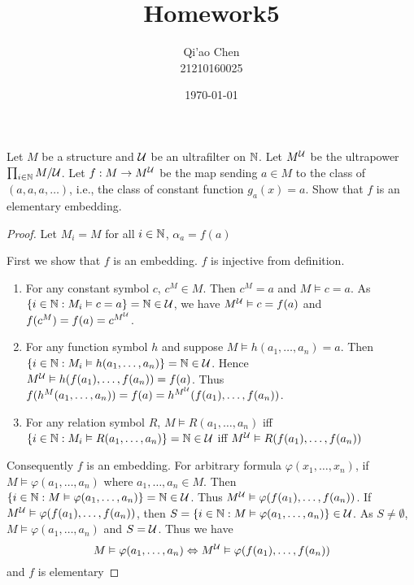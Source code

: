 \documentclass[11pt]{article}
\author{Qi'ao Chen\\21210160025}
\date{\today}
\title{Homework5}
\begin{document}
\maketitle
\begin{exercise}
Let \(M\) be a structure and \(\mathcal{U}\) be an ultrafilter on \(\mathbb{N}\). Let \(M^{\mathcal{U}}\) be the
ultrapower \(\prod_{i\in\mathbb{N}}M/\mathcal{U}\). Let \(f:M\to M^{\mathcal{U}}\) be the map sending \(a\in M\) to the class
of \((a,a,a,\dots)\), i.e., the class of constant function \(g_a(x)=a\). Show that \(f\) is an elementary
embedding.
\end{exercise}

\begin{proof}
Let \(M_i=M\) for all \(i\in\mathbb{N}\), \(\alpha_a=f(a)\)


First we show that \(f\) is an embedding. \(f\) is injective from definition.

\begin{enumerate}
\item For any constant symbol \(c\), \(c^M\in M\). Then \(c^M=a\) and \(M\vDash c=a\). As \(\{i\in\mathbb{N}:M_i\vDash c=a\}=\mathbb{N}\in\mathcal{U}\),
we have \(M^{\mathcal{U}}\vDash c=f(a)\) and \(f(c^M)=f(a)=c^{M^{\mathcal{U}}}\).
\item For any function symbol \(h\) and suppose \(M\vDash h(a_1,\dots,a_n)=a\).
Then \(\{i\in\mathbb{N}:M_i\vDash h(a_1,\dots,a_n)\}=\mathbb{N}\in\mathcal{U}\). Hence \(M^{\mathcal{U}}\vDash h(f(a_1),\dots,f(a_n))=f(a)\). Thus
\(f(h^M(a_1,\dots,a_n))=f(a)=h^{M^{\mathcal{U}}}(f(a_1),\dots,f(a_n))\).
\item For any relation symbol \(R\), \(M\vDash R(a_1,\dots,a_n)\) iff \(\{i\in\mathbb{N}:M_i\vDash R(a_1,\dots,a_n)\}=\mathbb{N}\in\mathcal{U}\)
iff \(M^{\mathcal{U}}\vDash R(f(a_1),\dots,f(a_n))\)
\end{enumerate}


Consequently \(f\) is an embedding. For arbitrary formula \(\varphi(x_1,\dots,x_n)\), if \(M\vDash\varphi(a_1,\dots,a_n)\) where \(a_1,\dots,a_n\in M\).
Then \(\{i\in\mathbb{N}:M\vDash\varphi(a_1,\dots,a_n)\}=\mathbb{N}\in\mathcal{U}\). Thus \(M^{\mathcal{U}}\vDash\varphi(f(a_1),\dots,f(a_n))\). If \(M^{\mathcal{U}}\vDash\varphi(f(a_1),\dots,f(a_n))\),
then \(S=\{i\in\mathbb{N}:M\vDash\varphi(a_1,\dots,a_n)\}\in\mathcal{U}\). As \(S\neq\emptyset\), \(M\vDash\varphi(a_1,\dots,a_n)\) and \(S=\mathcal{U}\). Thus we have
\begin{equation*}
M\vDash\varphi(a_1,\dots,a_n)\Leftrightarrow M^{\mathcal{U}}\vDash\varphi(f(a_1),\dots,f(a_n))
\end{equation*}
and \(f\) is elementary
\end{proof}
\end{document}
